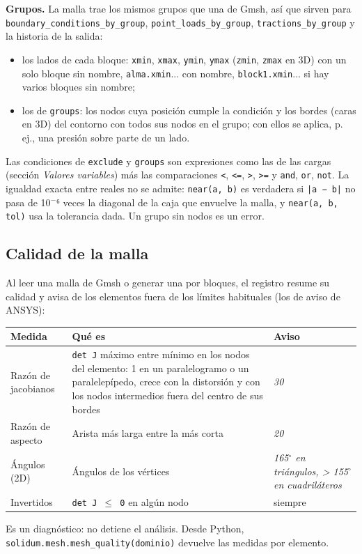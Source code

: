 \documentclass[11pt,oneside]{report}
\begin{document}
\textbf{Grupos.} La malla trae los mismos grupos que una de Gmsh, así que sirven para \texttt{boundary\_\allowbreak{}conditions\_\allowbreak{}by\_\allowbreak{}group}, \texttt{point\_\allowbreak{}loads\_\allowbreak{}by\_\allowbreak{}group}, \texttt{tractions\_\allowbreak{}by\_\allowbreak{}group} y la historia de la salida:

\begin{itemize}
  \item los lados de cada bloque: \texttt{xmin}, \texttt{xmax}, \texttt{ymin}, \texttt{ymax} (\texttt{zmin}, \texttt{zmax} en 3D) con un solo bloque sin nombre, \texttt{alma.xmin}... con nombre, \texttt{block1.xmin}... si hay varios bloques sin nombre;
  \item los de \texttt{groups}: los nodos cuya posición cumple la condición y los bordes (caras en 3D) del contorno con todos sus nodos en el grupo; con ellos se aplica, p. ej., una presión sobre parte de un lado.
\end{itemize}

Las condiciones de \texttt{exclude} y \texttt{groups} son expresiones como las de las cargas (sección \textit{Valores variables}) más las comparaciones \texttt{\textless{}}, \texttt{\textless{}=}, \texttt{\textgreater{}}, \texttt{\textgreater{}=} y \texttt{and}, \texttt{or}, \texttt{not}. La igualdad exacta entre reales no se admite: \texttt{near(a, b)} es verdadera si \texttt{|a − b|} no pasa de 10\ensuremath{^{-}}⁶ veces la diagonal de la caja que envuelve la malla, y \texttt{near(a, b, tol)} usa la tolerancia dada. Un grupo sin nodos es un error.

\subsection{Calidad de la malla}

Al leer una malla de Gmsh o generar una por bloques, el registro resume su calidad y avisa de los elementos fuera de los límites habituales (los de aviso de ANSYS):

\begin{center}
\begin{tabularx}{\textwidth}{YYY}
\hline
\textbf{Medida} & \textbf{Qué es} & \textbf{Aviso} \\
\hline
Razón de jacobianos & \texttt{det J} máximo entre mínimo en los nodos del elemento: 1 en un paralelogramo o un paralelepípedo, crece con la distorsión y con los nodos intermedios fuera del centro de sus bordes & \textit{30} \\
Razón de aspecto & Arista más larga entre la más corta & \textit{20} \\
Ángulos (2D) & Ángulos de los vértices & \textit{165\ensuremath{^{\circ}} en triángulos, \textgreater{} 155\ensuremath{^{\circ}} en cuadriláteros} \\
Invertidos & \texttt{det J \ensuremath{\le} 0} en algún nodo & siempre \\
\hline
\end{tabularx}
\end{center}
Es un diagnóstico: no detiene el análisis. Desde Python, \texttt{solidum.\allowbreak{}mesh.\allowbreak{}mesh\_\allowbreak{}quality(dominio)} devuelve las medidas por elemento.
\end{document}
